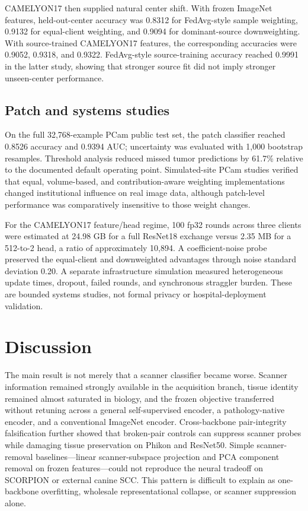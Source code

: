\documentclass[10pt]{article}
\begin{document}
CAMELYON17 then supplied natural center shift. With frozen ImageNet features, held-out-center accuracy was 0.8312 for FedAvg-style sample weighting, 0.9132 for equal-client weighting, and 0.9094 for dominant-source downweighting. With source-trained CAMELYON17 features, the corresponding accuracies were 0.9052, 0.9318, and 0.9322. FedAvg-style source-training accuracy reached 0.9991 in the latter study, showing that stronger source fit did not imply stronger unseen-center performance.

\subsection{Patch and systems studies}
On the full 32,768-example PCam public test set, the patch classifier reached 0.8526 accuracy and 0.9394 AUC; uncertainty was evaluated with 1,000 bootstrap resamples. Threshold analysis reduced missed tumor predictions by 61.7\% relative to the documented default operating point. Simulated-site PCam studies verified that equal, volume-based, and contribution-aware weighting implementations changed institutional influence on real image data, although patch-level performance was comparatively insensitive to those weight changes.

For the CAMELYON17 feature/head regime, 100 fp32 rounds across three clients were estimated at 24.98 GB for a full ResNet18 exchange versus 2.35 MB for a 512-to-2 head, a ratio of approximately 10,894. A coefficient-noise probe preserved the equal-client and downweighted advantages through noise standard deviation 0.20. A separate infrastructure simulation measured heterogeneous update times, dropout, failed rounds, and synchronous straggler burden. These are bounded systems studies, not formal privacy or hospital-deployment validation.

\section{Discussion}
The main result is not merely that a scanner classifier became worse. Scanner information remained strongly available in the acquisition branch, tissue identity remained almost saturated in biology, and the frozen objective transferred without retuning across a general self-supervised encoder, a pathology-native encoder, and a conventional ImageNet encoder. Cross-backbone pair-integrity falsification further showed that broken-pair controls can suppress scanner probes while damaging tissue preservation on Phikon and ResNet50. Simple scanner-removal baselines---linear scanner-subspace projection and PCA component removal on frozen features---could not reproduce the neural tradeoff on SCORPION or external canine SCC. This pattern is difficult to explain as one-backbone overfitting, wholesale representational collapse, or scanner suppression alone.
\end{document}
